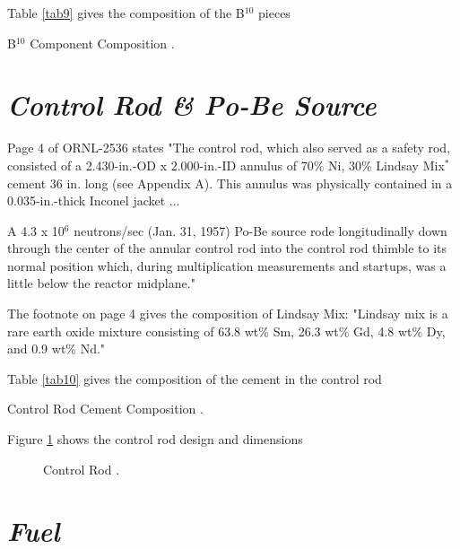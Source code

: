 \documentclass[ms,a4paper]{memoir}
\newcommand*{\msrarchive}{../../msr-archive}%
\begin{document}
Table \ref{tab9} gives the composition of the B$^{10}$ pieces

\begin{table}[H]
  \centering
  \caption{B$^{10}$ Component Composition \parencite[Table 21]{ornl-2536}.}
  \label{tab9}
\end{table}



\section{\emph{Control Rod \& Po-Be Source}}

Page 4 of ORNL-2536 states "The control rod, which also served as a safety rod, consisted of a 2.430-in.-OD x 2.000-in.-ID annulus of 70\% Ni, 30\% Lindsay Mix$^*$ cement 36 in. long (see Appendix A). This annulus was physically contained in a 0.035-in.-thick Inconel jacket ...

A 4.3 x 10$^6$ neutrons/sec (Jan. 31, 1957) Po-Be source rode longitudinally down through the center of the annular control rod into the control rod thimble to its normal position which, during multiplication measurements and startups, was a little below the reactor midplane."

The footnote on page 4 gives the composition of Lindsay Mix: "Lindsay mix is a rare earth oxide mixture consisting of 63.8  wt\% Sm, 26.3 wt\% Gd, 4.8 wt\% Dy, and 0.9 wt\% Nd."

Table \ref{tab10} gives the composition of the cement in the control rod

\begin{table}[H]
  \centering
  \caption{Control Rod Cement Composition \parencite[Table 22]{ornl-2536}.}
  \label{tab10}
\end{table}


Figure \ref{fig8} shows the control rod design and dimensions

\begin{figure}[H]
  \centering
  \caption{Control Rod \parencite[Figure 28]{ornl-2536}.}
  \label{fig8}
\end{figure}

\section{\emph{Fuel}}
\end{document}
